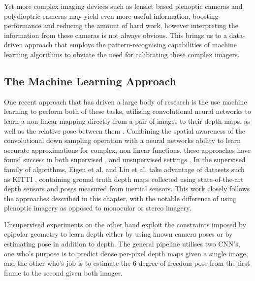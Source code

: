 \documentclass[openany]{book}
\begin{document}
Yet more complex imaging devices such as lenslet based plenoptic cameras and polydioptric cameras may yield even more useful information, boosting performance and reducing the amount of hard work, however interpreting the information from these cameras is not always obvious. This brings us to a data-driven approach that employs the pattern-recognising capabilities of machine learning algorithms to obviate the need for calibrating these complex imagers.


\subsection{The Machine Learning Approach}

One recent approach that has driven a large body of research is the use machine learning to perform both of these tasks, utilising convolutional neural networks to learn a non-linear mapping directly from a pair of images to their depth maps, as well as the relative pose between them \cite{eigen2014supervised, garg2016unsupervised,godard2016consistency, liu2015supervised, zhou2017unsupervised}. Combining the spatial awareness of the convolutional down sampling operation with a neural networks ability to learn accurate approximations for complex, non linear functions, these approaches have found success in both supervised \cite{liu2015supervised, eigen2014supervised}, and unsupervised settings \cite{garg2016unsupervised, godard2016consistency, zhou2017unsupervised}. In the supervised family of algorithms, Eigen et al. \cite{eigen2014supervised} and Liu et al. \cite{liu2015supervised} take advantage of datasets such as KITTI \cite{dataset-kitti}, containing ground truth depth maps collected using state-of-the-art depth sensors and poses measured from inertial sensors. This work closely follows the approaches described in this chapter, with the notable difference of using plenoptic imagery as opposed to monocular or stereo imagery. 

Unsupervised experiments \cite{garg2016unsupervised, godard2016consistency,zhou2017unsupervised} on the other hand exploit the constraints imposed by epipolar geometry to learn depth either by using known camera poses or by estimating pose in addition to depth. The general pipeline utilises two CNN's, one who's purpose is to predict dense per-pixel depth maps given a single image, and the other who's job is to estimate the 6 degree-of-freedom pose from the first frame to the second given both images.
\end{document}
